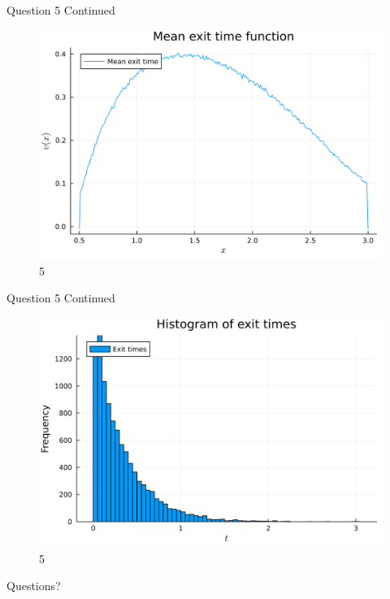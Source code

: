 \documentclass[compress,12pt]{beamer}
\begin{document}
\begin{frame}{Question 5 Continued}
      \begin{figure}[H]
            \centering
            \includegraphics[scale=0.05]{imgs/5mean_exit_time.png}
            \caption{5}
            \label{fig:5}
      \end{figure}
\end{frame}

\begin{frame}{Question 5 Continued}
      \begin{figure}[H]
            \centering
            \includegraphics[scale=0.05]{imgs/5exit_times_histogram.png}
            \caption{5}
            \label{fig:5_exittimeshist}
      \end{figure}
\end{frame}

\End
\begin{frame}
      \centering
      Questions?
\end{frame}
\end{document}
